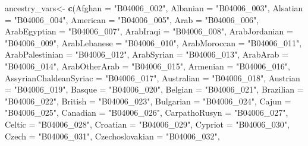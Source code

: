 \documentclass[
]{article}
\newenvironment{Shaded}{\begin{snugshade}}{\end{snugshade}}
\newcommand{\DataTypeTok}[1]{\textcolor[rgb]{0.13,0.29,0.53}{#1}}
\newcommand{\KeywordTok}[1]{\textcolor[rgb]{0.13,0.29,0.53}{\textbf{#1}}}
\newcommand{\NormalTok}[1]{#1}
\newcommand{\StringTok}[1]{\textcolor[rgb]{0.31,0.60,0.02}{#1}}
\begin{document}
\begin{Shaded}
\begin{Highlighting}[]
\NormalTok{ancestry_vars<-}\StringTok{ }\KeywordTok{c}\NormalTok{(}\DataTypeTok{Afghan =} \StringTok{"B04006_002"}\NormalTok{,}
                   \DataTypeTok{Albanian =} \StringTok{"B04006_003"}\NormalTok{,}
                   \DataTypeTok{Alsatian =} \StringTok{"B04006_004"}\NormalTok{,}
                   \DataTypeTok{American =} \StringTok{"B04006_005"}\NormalTok{,}
                   \DataTypeTok{Arab =} \StringTok{"B04006_006"}\NormalTok{,}
                   \DataTypeTok{ArabEgyptian =} \StringTok{"B04006_007"}\NormalTok{,}
                   \DataTypeTok{ArabIraqi =} \StringTok{"B04006_008"}\NormalTok{,}
                   \DataTypeTok{ArabJordanian =} \StringTok{"B04006_009"}\NormalTok{,}
                   \DataTypeTok{ArabLebanese =} \StringTok{"B04006_010"}\NormalTok{,}
                   \DataTypeTok{ArabMoroccan =} \StringTok{"B04006_011"}\NormalTok{,}
                   \DataTypeTok{ArabPalestinian =} \StringTok{"B04006_012"}\NormalTok{,}
                   \DataTypeTok{ArabSyrian =} \StringTok{"B04006_013"}\NormalTok{,}
                   \DataTypeTok{ArabArab =} \StringTok{"B04006_014"}\NormalTok{,}
                   \DataTypeTok{ArabOtherArab =} \StringTok{"B04006_015"}\NormalTok{,}
                   \DataTypeTok{Armenian =} \StringTok{"B04006_016"}\NormalTok{,}
                   \DataTypeTok{AssyrianChaldeanSyriac =} \StringTok{"B04006_017"}\NormalTok{,}
                   \DataTypeTok{Australian =} \StringTok{"B04006_018"}\NormalTok{,}
                   \DataTypeTok{Austrian =} \StringTok{"B04006_019"}\NormalTok{,}
                   \DataTypeTok{Basque =} \StringTok{"B04006_020"}\NormalTok{,}
                   \DataTypeTok{Belgian =} \StringTok{"B04006_021"}\NormalTok{,}
                   \DataTypeTok{Brazilian =} \StringTok{"B04006_022"}\NormalTok{,}
                   \DataTypeTok{British =} \StringTok{"B04006_023"}\NormalTok{,}
                   \DataTypeTok{Bulgarian =} \StringTok{"B04006_024"}\NormalTok{,}
                   \DataTypeTok{Cajun =} \StringTok{"B04006_025"}\NormalTok{,}
                   \DataTypeTok{Canadian =} \StringTok{"B04006_026"}\NormalTok{,}
                   \DataTypeTok{CarpathoRusyn =} \StringTok{"B04006_027"}\NormalTok{,}
                   \DataTypeTok{Celtic =} \StringTok{"B04006_028"}\NormalTok{,}
                   \DataTypeTok{Croatian =} \StringTok{"B04006_029"}\NormalTok{,}
                   \DataTypeTok{Cypriot =} \StringTok{"B04006_030"}\NormalTok{,}
                   \DataTypeTok{Czech =} \StringTok{"B04006_031"}\NormalTok{,}
                   \DataTypeTok{Czechoslovakian =} \StringTok{"B04006_032"}\NormalTok{,}

\end{Highlighting}
\end{Shaded}
\end{document}
